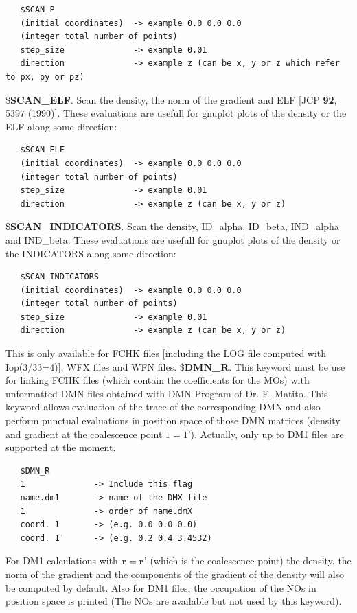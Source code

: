\documentclass[10pt,a4paper]{article}
\begin{document}
\begin{verbatim}
   $SCAN_P
   (initial coordinates)  -> example 0.0 0.0 0.0
   (integer total number of points)
   step_size              -> example 0.01
   direction              -> example z (can be x, y or z which refer to px, py or pz)
\end{verbatim}
\noindent \$\textbf{SCAN\_ELF}. Scan the density, the norm of the gradient and ELF [JCP {\bf 92}, 5397 (1990)]. These evaluations are usefull for gnuplot plots of the density or the ELF along some direction:\newline
\begin{verbatim}
   $SCAN_ELF
   (initial coordinates)  -> example 0.0 0.0 0.0
   (integer total number of points)
   step_size              -> example 0.01
   direction              -> example z (can be x, y or z)
\end{verbatim}
\noindent \$\textbf{SCAN\_INDICATORS}. Scan the density, ID\_alpha, ID\_beta, IND\_alpha and IND\_beta. These evaluations are usefull for gnuplot plots of the density or the INDICATORS along some direction:\newline
\begin{verbatim}
   $SCAN_INDICATORS
   (initial coordinates)  -> example 0.0 0.0 0.0
   (integer total number of points)
   step_size              -> example 0.01
   direction              -> example z (can be x, y or z)
\end{verbatim}
This is only available for FCHK files $[$including the LOG file computed with Iop(3/33=4)$]$, WFX files and WFN files.\newline 
\noindent \$\textbf{DMN\_R}. This keyword must be use for linking FCHK files (which contain the coefficients for the MOs) with unformatted DMN files obtained with DMN Program of Dr. E. Matito. This keyword allows evaluation of the trace of the corresponding DMN and also perform punctual evaluations in position space of those DMN matrices (density and gradient at the coalescence point $1=1$'). Actually, only up to DM1 files are supported at the moment. 
\begin{verbatim}
   $DMN_R
   1              -> Include this flag
   name.dm1       -> name of the DMX file
   1              -> order of name.dmX
   coord. 1       -> (e.g. 0.0 0.0 0.0)
   coord. 1'      -> (e.g. 0.2 0.4 3.4532)
\end{verbatim}
For DM1 calculations with ${\bf r} ={\bf r}$' (which is the coalescence point) the density, the norm of the gradient and the components of the gradient of the density will also be computed by default. Also for DM1 files, the occupation of the NOs in position space is printed (The NOs are available but not used by this keyword).
\end{document}
